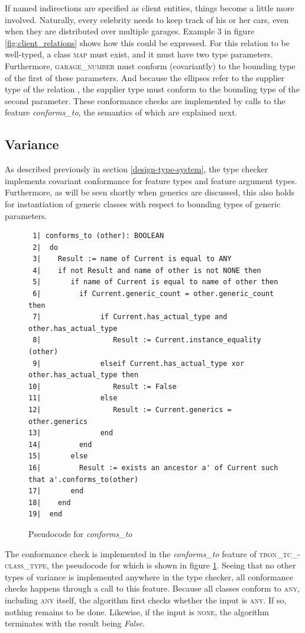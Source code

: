 If named indirections are specified as client entities, things become a little more involved. Naturally, every celebrity needs to keep track of his or her cars, even when they are distributed over multiple garages. Example 3 in figure \ref{fig:client_relations} shows how this could be expressed. For this relation to be well-typed, a class \textsc{map} must exist, and it must have two type parameters. Furthermore, \textsc{garage\_number} must conform (covariantly) to the bounding type of the first of these parameters. And because the ellipses refer to the supplier type of the relation \cite[p.~371]{walden1995}, the supplier type must conform to the bounding type of the second parameter. These conformance checks are implemented by calls to the feature \textit{conforms\_to}, the semantics of which are explained next.
\subsection{Variance}
\label{implementation-variance}
\label{variance}
As described previously in section \ref{design-type-system}, the type checker implements covariant conformance for feature types and feature argument types. Furthermore, as will be seen shortly when generics are discussed, this also holds for instantiation of generic classes with respect to bounding types of generic parameters.
\begin{figure}[H]
{\footnotesize
\begin{verbatim}
 1| conforms_to (other): BOOLEAN
 2|  do
 3|    Result := name of Current is equal to ANY
 4|    if not Result and name of other is not NONE then
 5|       if name of Current is equal to name of other then
 6|         if Current.generic_count = other.generic_count then
 7|              if Current.has_actual_type and other.has_actual_type
 8|                 Result := Current.instance_equality (other)
 9|              elseif Current.has_actual_type xor other.has_actual_type then
10|                 Result := False
11|              else
12|                 Result := Current.generics = other.generics
13|              end
14|         end
15|       else
16|         Result := exists an ancestor a' of Current such that a'.conforms_to(other)
17|       end
18|    end
19|  end
\end{verbatim}
}
\caption{Pseudocode for \textit{conforms\_to}}
\label{fig:conforms_to}
\end{figure}
The conformance check is implemented in the \textit{conforms\_to} feature of \textsc{tbon\_tc\_- class\_type}, the pseudocode for which is shown in figure \ref{fig:conforms_to}. Seeing that no other types of variance is implemented anywhere in the type checker, all conformance checks happens through a call to this feature.
Because all classes conform to \textsc{any}, including \textsc{any} itself, the algorithm first checks whether the input is \textsc{any}. If so, nothing remains to be done. Likewise, if the input is \textsc{none}, the algorithm terminates with the result being \textit{False}.

